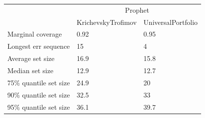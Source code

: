 \begin{tabular}{lll}
\toprule
& \multicolumn{2}{c}{Prophet} \\
& KrichevskyTrofimov & UniversalPortfolio \\
\midrule
Marginal coverage & 0.92 & 0.95 \\
Longest err sequence & 15 & 4 \\
Average set size & 16.9 & 15.8 \\
Median set size & 12.9 & 12.7 \\
75\% quantile set size & 24.9 & 20 \\
90\% quantile set size & 32.5 & 33 \\
95\% quantile set size & 36.1 & 39.7 \\
\bottomrule
\end{tabular}
